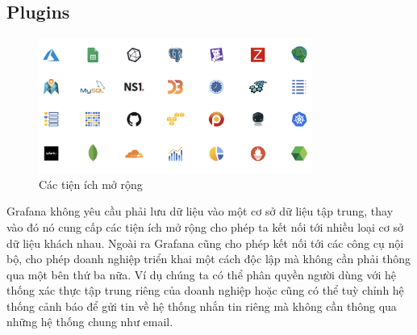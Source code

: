 \subsection{Plugins}
\begin{figure}[H] %
    \centering %
    \includegraphics[width=0.8\textwidth]{figures/grafana_plugins.png} 
    \caption{Các tiện ích mở rộng} %
    \label{fig:fig_01}
\end{figure}
Grafana không yêu cầu phải lưu dữ liệu vào một cơ sở dữ liệu tập trung, thay vào đó nó cung cấp các tiện ích mở rộng cho phép ta kết nối tới nhiều loại cơ sở dữ liệu khách nhau. Ngoài ra Grafana cũng cho phép kết nối tới các công cụ nội bộ, cho phép doanh nghiệp triển khai một cách độc lập mà không cần phải thông qua một bên thứ ba nữa. Ví dụ chúng ta có thể phân quyền người dùng với hệ thống xác thực tập trung riêng của doanh nghiệp hoặc cũng có thể tuỳ chỉnh hệ thống cảnh báo để gửi tin về hệ thống nhắn tin riêng mà không cần thông qua những hệ thống chung như email.

